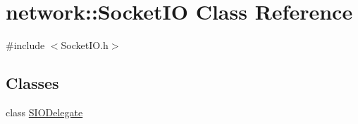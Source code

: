 \hypertarget{classnetwork_1_1SocketIO}{}\section{network\+:\+:Socket\+IO Class Reference}
\label{classnetwork_1_1SocketIO}


{\ttfamily \#include $<$Socket\+I\+O.\+h$>$}

\subsection*{Classes}
\begin{DoxyCompactItemize}
\item 
class \hyperlink{classnetwork_1_1SocketIO_1_1SIODelegate}{S\+I\+O\+Delegate}
\end{DoxyCompactItemize}

